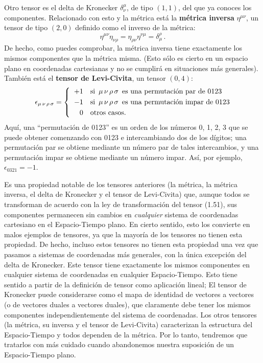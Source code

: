 \documentclass[11pt,b5paper,openany,twoside]{book}
\newcommand{\mn}{{\mu\nu}}
\begin{document}
Otro tensor es el delta de Kronecker $\delta^\mu_\nu$, de tipo $(1,1)$, del que ya conoces los componentes.
Relacionado con esto y la métrica está la {\bf métrica inversa} $\eta^\mn$, un tensor de tipo $(2,0)$ definido como el inverso de la métrica:
\begin{equation}
\eta^\mn\eta_{\nu\rho} = \eta_{\rho\nu}\eta^{\nu\mu}
= \delta^\rho_\mu\,.\label{1.56}
\end{equation}
De hecho, como puedes comprobar, la métrica inversa tiene exactamente los mismos componentes que la métrica misma.
(Esto sólo es cierto en un espacio plano en coordenadas cartesianas y no se cumplirá en situaciones más generales).
También está el {\bf tensor de Levi-Civita}, un tensor $(0,4)$:
\begin{equation}
\epsilon_{\mu\,\nu\,\rho\,\sigma} =
\left\{\hspace{2mm}
\begin{aligned}
+1 \quad &\text{si $\,\mu\,\nu\,\rho\,\sigma\,$ es una permutación par de 0123} \\
-1  \quad &\text{si $\,\mu\,\nu\,\rho\,\sigma\,$ es una permutación impar de 0123} \\
0  \quad &\text{otros casos.}
\end{aligned} \right.
\label{1.57}
\end{equation}
Aquí, una ``permutación de 0123'' es un orden de los números 0, 1, 2, 3 que se puede obtener comenzando con 0123 e intercambiando dos de los dígitos; una permutación par se obtiene mediante un número par de tales intercambios, y una permutación impar se obtiene mediante un número impar.
Así, por ejemplo, $\epsilon_{0321}=-1$.

Es una propiedad notable de los tensores anteriores (la métrica, la métrica inversa, el delta de Kronecker y el tensor de Levi-Civita) que, aunque todos se transforman de acuerdo con la ley de transformación del tensor (1.51), sus componentes permanecen sin cambios en \textit{cualquier} sistema de coordenadas cartesiano en el Espacio-Tiempo plano.
En cierto sentido, esto los convierte en malos ejemplos de tensores, ya que la mayoría de los tensores no tienen esta propiedad.
De hecho, incluso estos tensores no tienen esta propiedad una vez que pasamos a sistemas de coordenadas más generales, con la única excepción del delta de Kronecker.
Este tensor tiene exactamente los mismos componentes en cualquier sistema de coordenadas en cualquier Espacio-Tiempo.
Esto tiene sentido a partir de la definición de tensor como aplicación lineal; El tensor de Kronecker puede considerarse como el mapa de identidad de vectores a vectores (o de vectores duales a vectores duales), que claramente debe tener los mismos componentes independientemente del sistema de coordenadas.
Los otros tensores (la métrica, su inversa y el tensor de Levi-Civita) caracterizan la estructura del Espacio-Tiempo y todos dependen de la métrica.
Por lo tanto, tendremos que tratarlos con más cuidado cuando abandonemos nuestra suposición de un Espacio-Tiempo plano.
\end{document}
